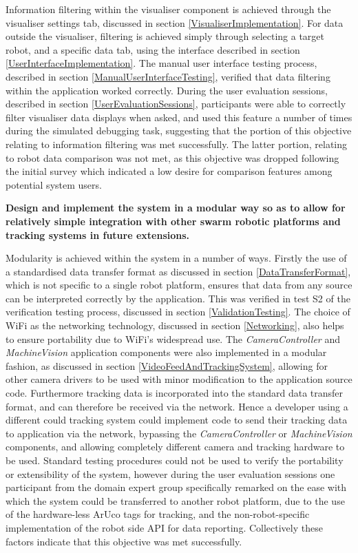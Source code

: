 Information filtering within the visualiser component is achieved through the visualiser settings tab, discussed in section \ref{VisualiserImplementation}. For data outside the visualiser, filtering is achieved simply through selecting a target robot, and a specific data tab, using the interface described in section \ref{UserInterfaceImplementation}. The manual user interface testing process, described in section \ref{ManualUserInterfaceTesting}, verified that data filtering within the application worked correctly. During the user evaluation sessions, described in section \ref{UserEvaluationSessions}, participants were able to correctly filter visualiser data displays when asked, and used this feature a number of times during the simulated debugging task, suggesting that the portion of this objective relating to information filtering was met successfully. The latter portion, relating to robot data comparison was not met, as this objective was dropped following the initial survey which indicated a low desire for comparison features among potential system users.

\noindent \textbf{Design and implement the system in a modular way so as to allow for relatively simple integration with other swarm robotic platforms and tracking systems in future extensions.}

Modularity is achieved within the system in a number of ways. Firstly the use of a standardised data transfer format as discussed in section \ref{DataTransferFormat}, which is not specific to a single robot platform, ensures that data from any source can be interpreted correctly by the application. This was verified in test S2 of the verification testing process, discussed in section \ref{ValidationTesting}. The choice of WiFi as the networking technology, discussed in section \ref{Networking}, also helps to ensure portability due to WiFi's widespread use. The \textit{CameraController} and \textit{MachineVision} application components were also implemented in a modular fashion, as discussed in section \ref{VideoFeedAndTrackingSystem}, allowing for other camera drivers to be used with minor modification to the application source code. Furthermore tracking data is incorporated into the standard data transfer format, and can therefore be received via the network. Hence a developer using a different could tracking system could implement code to send their tracking data to application via the network, bypassing the \textit{CameraController} or \textit{MachineVision} components, and allowing completely different camera and tracking hardware to be used. Standard testing procedures could not be used to verify the portability or extensibility of the system, however during the user evaluation sessions one participant from the domain expert group specifically remarked on the ease with which the system could be transferred to another robot platform, due to the use of the hardware-less ArUco tags for tracking, and the non-robot-specific implementation of the robot side API for data reporting. Collectively these factors indicate that this objective was met successfully.


